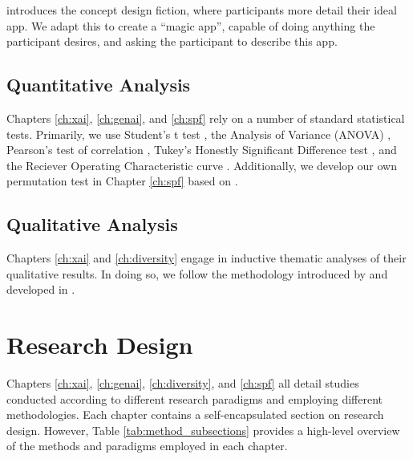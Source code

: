 \textcite{blythe2014research} introduces the concept design fiction, where participants more detail their ideal app. We adapt this to create a ``magic app'', capable of doing anything the participant desires, and asking the participant to describe this app.

\subsection{Quantitative Analysis}
Chapters \ref{ch:xai}, \ref{ch:genai}, and \ref{ch:spf} rely on a number of standard statistical tests. Primarily, we use Student's t test \cite{Mishra_Singh_Pandey_Mishra_Pandey_2019}, the Analysis of Variance (ANOVA) \cite{Mishra_Singh_Pandey_Mishra_Pandey_2019}, Pearson's test of correlation \cite{Schober_Boer_Schwarte_2018}, Tukey's Honestly Significant Difference test \cite{Kim_2015}, and the Reciever Operating Characteristic curve \cite{hanley1989receiver}. Additionally, we develop our own permutation test in Chapter \ref{ch:spf} based on \textcite{good2013permutation}.

\subsection{Qualitative Analysis}
Chapters \ref{ch:xai} and \ref{ch:diversity} engage in inductive thematic analyses of their qualitative results. In doing so, we follow the methodology introduced by \textcite{braun_using_2006} and developed in \textcite{braun_conceptual_2022,braun_toward_2023,noauthor_thematic_nodate}.

\section{Research Design}
Chapters \ref{ch:xai}, \ref{ch:genai}, \ref{ch:diversity}, and \ref{ch:spf} all detail studies conducted according to different research paradigms and employing different methodologies. Each chapter contains a self-encapsulated section on research design. However, Table \ref{tab:method_subsections} provides a high-level overview of the methods and paradigms employed in each chapter.

